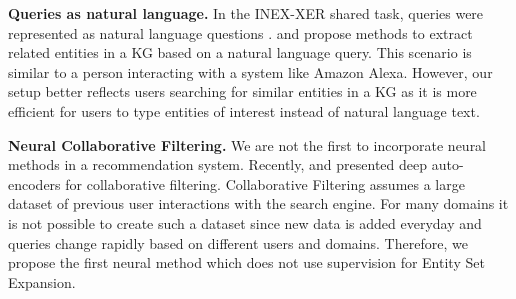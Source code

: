 \documentclass[a4paper]{article}
\newcommand{\Todo}[2][red]{\todo[]{\textcolor{#1}{\footnotesize #2}}}
\newcommand{\erLong}{Entity Set Expansion\xspace}
\newcommand{\mycite}[1]{\cite{#1}}%
\newcommand{\mynewcite}[1]{\cite{#1}}%
\begin{document}
\noindent
{\bf Queries as natural language.}
In the INEX-XER shared task,
queries were represented as natural language questions \mycite{demartini2009overview}.
\mynewcite{metzger2014aspect} %
and \mynewcite{zhang2017entity} propose methods to extract
related entities in a KG based on a natural language query.
This scenario is
similar to a person interacting with a system like Amazon Alexa. 
However, our setup
better reflects %
users %
searching for similar entities in a KG as it is more
efficient for users to type entities of interest instead of natural language text.

\noindent
{\bf Neural Collaborative Filtering.}
We are not the first to incorporate neural methods in a recommendation system.
Recently, \mynewcite{He:2017:NCF:3038912.3052569} and \mynewcite{lee2017augmented}
presented deep auto-encoders for collaborative filtering.
Collaborative Filtering assumes a large dataset of previous user interactions with the search engine. For many domains it is not possible to create such a dataset since new data is added everyday and queries change rapidly based on different users and domains. Therefore, we propose the first neural method which does not use supervision for \erLong.




%
%
%
%
\end{document}
